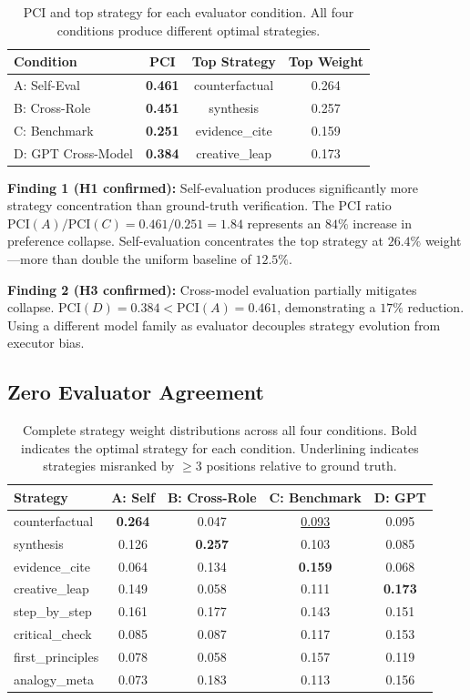 \documentclass[11pt,a4paper]{article}
\begin{document}
\begin{table}[H]
\centering
\caption{PCI and top strategy for each evaluator condition. All four conditions produce different optimal strategies.}
\begin{tabular}{lccc}
\toprule
\textbf{Condition} & \textbf{PCI} & \textbf{Top Strategy} & \textbf{Top Weight} \\
\midrule
A: Self-Eval      & \textbf{0.461} & counterfactual  & 0.264 \\
B: Cross-Role     & \textbf{0.451} & synthesis       & 0.257 \\
C: Benchmark      & \textbf{0.251} & evidence\_cite  & 0.159 \\
D: GPT Cross-Model & \textbf{0.384} & creative\_leap  & 0.173 \\
\bottomrule
\end{tabular}
\end{table}

\textbf{Finding 1 (H1 confirmed):} Self-evaluation produces significantly more strategy concentration than ground-truth verification. The PCI ratio $\text{PCI}(A)/\text{PCI}(C) = 0.461/0.251 = 1.84$ represents an $84\%$ increase in preference collapse. Self-evaluation concentrates the top strategy at $26.4\%$ weight---more than double the uniform baseline of $12.5\%$.

\textbf{Finding 2 (H3 confirmed):} Cross-model evaluation partially mitigates collapse. $\text{PCI}(D) = 0.384 < \text{PCI}(A) = 0.461$, demonstrating a $17\%$ reduction. Using a different model family as evaluator decouples strategy evolution from executor bias.

\subsection{Zero Evaluator Agreement}

\begin{table}[H]
\centering
\caption{Complete strategy weight distributions across all four conditions. Bold indicates the optimal strategy for each condition. Underlining indicates strategies misranked by $\geq 3$ positions relative to ground truth.}
\small
\begin{tabular}{lcccc}
\toprule
\textbf{Strategy} & \textbf{A: Self} & \textbf{B: Cross-Role} & \textbf{C: Benchmark} & \textbf{D: GPT} \\
\midrule
counterfactual  & \textbf{0.264} & 0.047 & \underline{0.093} & 0.095 \\
synthesis       & 0.126 & \textbf{0.257} & 0.103 & 0.085 \\
evidence\_cite  & 0.064 & 0.134 & \textbf{0.159} & 0.068 \\
creative\_leap  & 0.149 & 0.058 & 0.111 & \textbf{0.173} \\
step\_by\_step  & 0.161 & 0.177 & 0.143 & 0.151 \\
critical\_check & 0.085 & 0.087 & 0.117 & 0.153 \\
first\_principles & 0.078 & 0.058 & 0.157 & 0.119 \\
analogy\_meta   & 0.073 & 0.183 & 0.113 & 0.156 \\
\bottomrule
\end{tabular}
\end{table}
\end{document}
